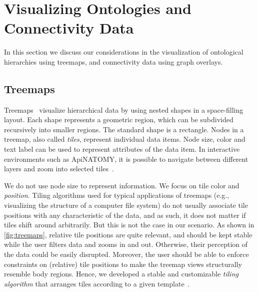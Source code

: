 \section{Visualizing Ontologies and Connectivity Data} \label{sect:visualization}        %

In this section we discuss our considerations in the visualization of ontological
hierarchies using treemaps, and connectivity data using graph overlays.

\subsection{Treemaps} %
\label{sec:treemaps}

Treemaps~\cite{JS91} visualize hierarchical data by using nested shapes in a space-filling layout.
Each shape represents a geometric region, which can be subdivided recursively into smaller regions.
The standard shape is a rectangle. Nodes in a treemap, also called \emph{tiles}, represent individual
data items. Node size, color and text label can be used to represent attributes of the data item.
In interactive environments such as ApiNATOMY, it is possible to navigate between different
layers and zoom into selected tiles~\cite{BL07}.

We do not use node size to represent information. We focus on tile color and \emph{position}.
Tiling algorithms used for typical applications of treemaps (e.g., visualizing the structure of a
computer file system) do not usually associate tile positions with any characteristic of
the data, and as such, it does not matter if tiles shift around arbitrarily. But this is not the
case in our scenario. As shown in \cref{fig:treemaps}, relative tile positions are quite relevant,
and should be kept stable while the user filters data and zooms in and out. Otherwise, their
perception of the data could be easily disrupted. Moreover, the user should be able to enforce
constraints on (relative) tile positions to make the treemap views structurally resemble body
regions. Hence, we developed a stable and customizable \emph{tiling algorithm} that arranges tiles
according to a given template~\cite{KBK14}.


